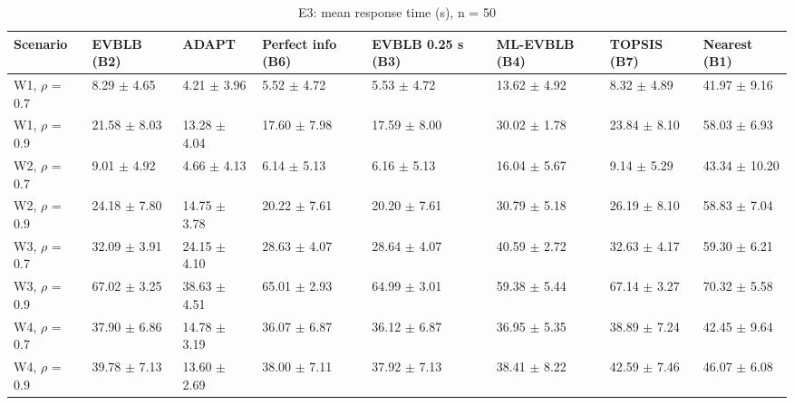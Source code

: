 \begin{table}[t]
\centering
\footnotesize
\caption{E3: mean response time (s), n = 50}
\label{tab:e3_response}
\begin{tabular}{llllllll}
\toprule
Scenario & EVBLB (B2) & ADAPT & Perfect info (B6) & EVBLB 0.25 s (B3) & ML-EVBLB (B4) & TOPSIS (B7) & Nearest (B1) \\
\midrule
W1, $\rho$ = 0.7 & 8.29 $\pm$ 4.65 & 4.21 $\pm$ 3.96 & 5.52 $\pm$ 4.72 & 5.53 $\pm$ 4.72 & 13.62 $\pm$ 4.92 & 8.32 $\pm$ 4.89 & 41.97 $\pm$ 9.16 \\
W1, $\rho$ = 0.9 & 21.58 $\pm$ 8.03 & 13.28 $\pm$ 4.04 & 17.60 $\pm$ 7.98 & 17.59 $\pm$ 8.00 & 30.02 $\pm$ 1.78 & 23.84 $\pm$ 8.10 & 58.03 $\pm$ 6.93 \\
W2, $\rho$ = 0.7 & 9.01 $\pm$ 4.92 & 4.66 $\pm$ 4.13 & 6.14 $\pm$ 5.13 & 6.16 $\pm$ 5.13 & 16.04 $\pm$ 5.67 & 9.14 $\pm$ 5.29 & 43.34 $\pm$ 10.20 \\
W2, $\rho$ = 0.9 & 24.18 $\pm$ 7.80 & 14.75 $\pm$ 3.78 & 20.22 $\pm$ 7.61 & 20.20 $\pm$ 7.61 & 30.79 $\pm$ 5.18 & 26.19 $\pm$ 8.10 & 58.83 $\pm$ 7.04 \\
W3, $\rho$ = 0.7 & 32.09 $\pm$ 3.91 & 24.15 $\pm$ 4.10 & 28.63 $\pm$ 4.07 & 28.64 $\pm$ 4.07 & 40.59 $\pm$ 2.72 & 32.63 $\pm$ 4.17 & 59.30 $\pm$ 6.21 \\
W3, $\rho$ = 0.9 & 67.02 $\pm$ 3.25 & 38.63 $\pm$ 4.51 & 65.01 $\pm$ 2.93 & 64.99 $\pm$ 3.01 & 59.38 $\pm$ 5.44 & 67.14 $\pm$ 3.27 & 70.32 $\pm$ 5.58 \\
W4, $\rho$ = 0.7 & 37.90 $\pm$ 6.86 & 14.78 $\pm$ 3.19 & 36.07 $\pm$ 6.87 & 36.12 $\pm$ 6.87 & 36.95 $\pm$ 5.35 & 38.89 $\pm$ 7.24 & 42.45 $\pm$ 9.64 \\
W4, $\rho$ = 0.9 & 39.78 $\pm$ 7.13 & 13.60 $\pm$ 2.69 & 38.00 $\pm$ 7.11 & 37.92 $\pm$ 7.13 & 38.41 $\pm$ 8.22 & 42.59 $\pm$ 7.46 & 46.07 $\pm$ 6.08 \\
\bottomrule
\end{tabular}
\end{table}
